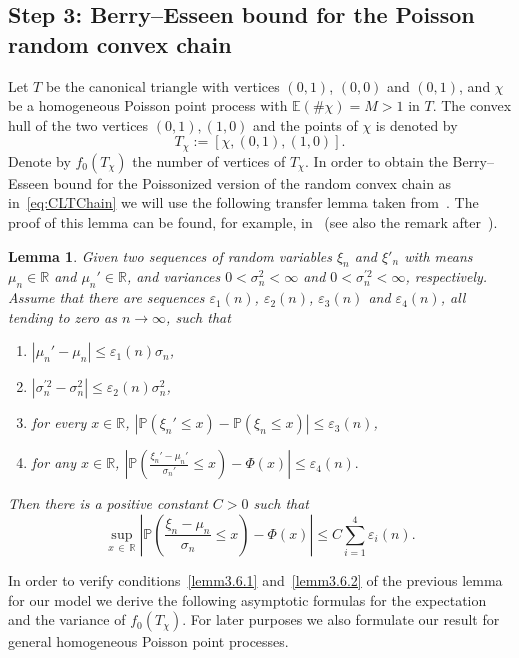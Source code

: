 \documentclass[10pt]{amsart}
\newtheorem{lemm}[theo]{Lemma}\newtheorem{prop}[theo]{Proposition}\newtheorem{coro}[theo]{Corollary}\newtheorem{conj}[theo]{Conjecture}
\theoremstyle{definition}\newtheorem{defi}[theo]{Definition}\newtheorem{rema}[theo]{Remark}\newtheorem{exam}[theo]{Example}\newtheorem{exem}[theo]{Example}\newtheorem{nota}[theo]{Notation}
\newcommand{\bbR}{\mathbb{R}}
\newcommand{\bbE}{\mathbb{E}}
\newcommand{\bbP}{\mathbb{P}}
\newcommand*{\romanenumi}{\renewcommand*{\theenumi}{\roman{enumi}}}
\begin{document}
\subsection{Step 3: Berry--Esseen bound for the Poisson random convex chain}\label{step3}

Let $T$ be the canonical triangle with vertices $(0,1)$, $(0,0)$ and $(0,1)$, and $\chi$ be a homogeneous Poisson point process with $\bbE(\#\chi)=M>1$ in $T$. The convex hull of the two vertices $(0,1), (1,0)$ and the points of $\chi$ is denoted by
\[
T_{\chi}:= [\chi, (0,1),(1,0)].
\]
Denote by $f_0(T_\chi)$ the number of vertices of $T_\chi$. In order to obtain the Berry--Esseen bound for the Poissonized version of the random convex chain as in~\eqref{eq:CLTChain} we will use the following transfer lemma taken from~\cite[Lemma~3.2]{BR10}. The proof of this lemma can be found, for example, in~\cite{BV06} (see also the remark after~\cite[Lemma~3.2]{BR10}).


\begin{lemm}\label{lm:transference}
Given two sequences of random variables $\xi_n$ and $\xi'_n$ with means $\mu_n\in\bbR$ and $\mu_n'\in\bbR$, and variances $0<\sigma_n^2<\infty$ and $0<\sigma_n^{'2}<\infty$, respectively. Assume that there are sequences $\varepsilon_1(n)$, $\varepsilon_2(n)$, $\varepsilon_3(n)$ and $\varepsilon_4(n)$, all tending to zero as $n\to \infty$, such that
\begin{enumerate}\romanenumi
\item\label{lemm3.6.1} $|\mu_n'-\mu_n|\leq \varepsilon_1(n)\sigma_n$,
\item\label{lemm3.6.2} $|\sigma_n^{'2}-\sigma_n^2|\leq \varepsilon_2(n)\sigma_n^{2}$,
\item\label{lemm3.6.3} for every $x\in\bbR$, $|\bbP(\xi_n'\leq x)-\bbP(\xi_n\leq x)|\leq \varepsilon_3(n)$,
\item\label{lemm3.6.4} for any $x\in\bbR$, $
|\bbP(\frac{\xi_n'-\mu_n'}{\sigma_n'}\leq x)-\Phi(x)|\leq \varepsilon_4(n). $
\end{enumerate}
Then there is a positive constant $C>0$ such that
\[
\sup_{x\,\in\,\bbR}\left|\bbP\left(\frac{\xi_n-\mu_n}{\sigma_n}\leq x\right)-\Phi(x)\right|\leq C\sum_{i=1}^4\varepsilon_i(n).
\]
\end{lemm}

In order to verify conditions~\eqref{lemm3.6.1} and~\eqref{lemm3.6.2}  of the previous lemma for our model we derive the following asymptotic formulas for the expectation and the variance of $f_0(T_{\chi})$. For later purposes we also formulate our result for general homogeneous Poisson point processes.
\end{document}
